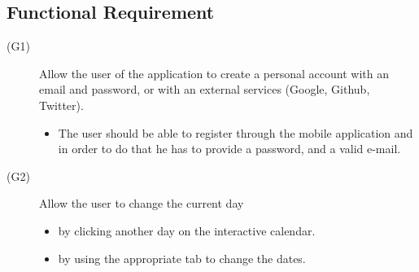 \documentclass [12pt]{article}
\begin{document}
\subsection{Functional Requirement}
\begin{description}
\item[(G1)]Allow the user of the application to create a personal account with an email and password, or with an external services (Google, Github, Twitter).
\begin{itemize}
\item The user should be able to register through the mobile application and in order to do that he has to provide a password, and a valid e-mail.\\
\end{itemize}
\end{description}

\begin{description}
\item[(G2)]Allow the user to change the current day
\begin{itemize}
\item  by clicking another day on the interactive calendar.
\item by using the appropriate tab to change the dates.
\end{itemize}
\end{description}
\end{document}
